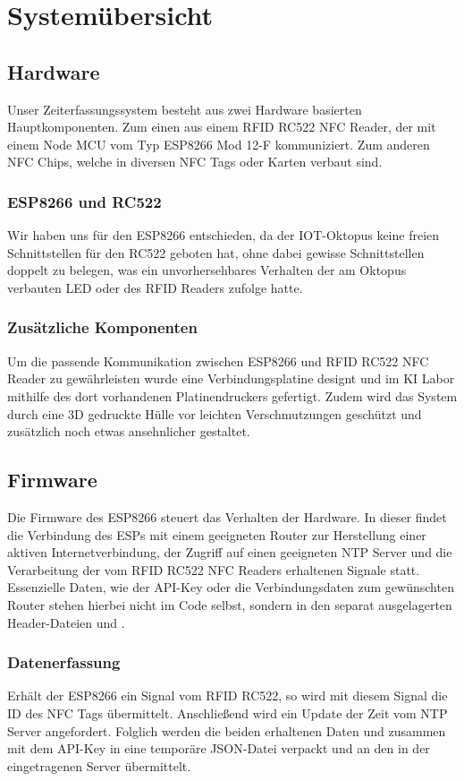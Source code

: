 \documentclass[../main.tex]{subfiles}
\begin{document}
\section{Systemübersicht}

\subsection{Hardware}
Unser Zeiterfassungssystem besteht aus zwei Hardware basierten Hauptkomponenten. Zum einen aus einem RFID RC522 NFC Reader, der mit einem Node MCU vom Typ ESP8266 Mod 12-F kommuniziert. Zum anderen NFC Chips, welche in diversen NFC Tags oder Karten verbaut sind.

\subsubsection{ESP8266 und RC522}
Wir haben uns für den ESP8266 entschieden, da der IOT-Oktopus keine freien Schnittstellen für den RC522 geboten hat, ohne dabei gewisse Schnittstellen doppelt zu belegen, was ein unvorhersehbares Verhalten der am Oktopus verbauten LED oder des RFID Readers zufolge hatte.

\subsubsection{Zusätzliche Komponenten}
Um die passende Kommunikation zwischen ESP8266 und RFID RC522 NFC Reader zu gewährleisten wurde eine Verbindungsplatine designt und im KI Labor mithilfe des dort vorhandenen Platinendruckers gefertigt. Zudem wird das System durch eine 3D gedruckte Hülle vor leichten Verschmutzungen geschützt und zusätzlich noch etwas ansehnlicher gestaltet. 



\subsection{Firmware}
Die Firmware des ESP8266 steuert das Verhalten der Hardware. In dieser findet die Verbindung des ESPs mit einem geeigneten Router zur Herstellung einer aktiven Internetverbindung, der Zugriff auf einen geeigneten NTP Server und die Verarbeitung der vom RFID RC522 NFC Readers erhaltenen Signale statt. Essenzielle Daten, wie der API-Key oder die Verbindungsdaten zum gewünschten Router stehen hierbei nicht im Code selbst, sondern in den separat ausgelagerten Header-Dateien  und .

\subsubsection{Datenerfassung}
Erhält der ESP8266 ein Signal vom RFID RC522, so wird mit diesem Signal die ID des NFC Tags übermittelt. Anschließend wird ein Update der Zeit vom NTP Server angefordert. Folglich werden die beiden erhaltenen Daten  und  zusammen mit dem API-Key in eine temporäre JSON-Datei verpackt und an den in der  eingetragenen Server übermittelt. 
\end{document}
